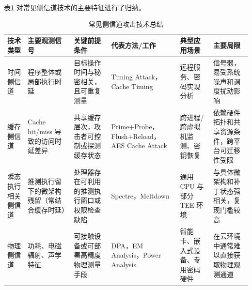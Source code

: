 表\ref{tab:side_channel_techniques_summary} 对常见侧信道技术的主要特征进行了归纳。

\begin{table}[htbp]
  \centering
  \renewcommand{\arraystretch}{1.16}
  \caption{常见侧信道攻击技术总结}
  \label{tab:side_channel_techniques_summary}
  \begin{tabular}{p{1.9cm}p{2.5cm}p{2.6cm}p{2.5cm}p{2.4cm}p{2.2cm}}
    \hline
    技术类型 & 主要观测信号 & 关键前提条件 & 代表方法/工作 & 典型应用场景 & 主要局限 \\
    \hline
    时间侧信道
    & 程序整体或局部执行时延
    & 目标操作时间与秘密相关，且可重复测量
    & Timing Attack\cite{kocher1996timing}，Cache Timing\cite{Bernstein2005CachetimingAO}
    & 远程服务、密码实现分析
    & 信号弱，易受系统噪声和调度扰动影响 \\

    缓存侧信道
    & Cache hit/miss 导致的访问时延差异
    & 共享缓存层次，攻击者可控制或探测缓存状态
    & Prime+Probe\cite{osvik2006cache}，Flush+Reload\cite{yarom2014flushreload}，AES Cache Attack\cite{tromer2010efficient}
    & 跨进程/跨虚拟机监测、密钥恢复
    & 依赖硬件拓扑和共享资源条件，跨平台可迁移性受限 \\

    瞬态执行相关侧信道
    & 推测执行留下的微架构残留（常结合缓存时延）
    & 处理器存在可利用的推测执行窗口或权限检查缺陷
    & Spectre\cite{kocher2020spectre}，Meltdown\cite{lipp2018meltdown}
    & 通用 CPU 与部分 TEE 环境
    & 与具体微架构和补丁状态强相关，复现门槛较高 \\

    物理侧信道
    & 功耗、电磁辐射、声学特征
    & 可接触设备或可部署高精度物理测量手段
    & DPA\cite{kocher1999differential}，EM Analysis\cite{gandolfi2001electromagnetic}，Power Analysis\cite{mangard2007power}
    & 智能卡、嵌入式设备、专用密码硬件
    & 在云环境中通常难以直接获取物理观测通道 \\
    \hline
  \end{tabular}
\end{table}
